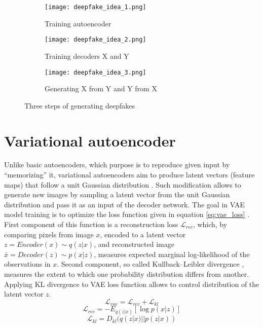 \begin{figure}[H]
\centering
\begin{subfigure}{12cm}
\texttt{[image: deepfake\_idea\_1.png]}
\caption{Training autoencoder}
\label{subfig:deepfake_steps_a}
\end{subfigure}

\begin{subfigure}{12cm}
\texttt{[image: deepfake\_idea\_2.png]}
\caption{Training decoders X and Y}
\label{subfig:deepfake_steps_b}
\end{subfigure}

\begin{subfigure}{12cm}
\texttt{[image: deepfake\_idea\_3.png]}
\caption{Generating X from Y and Y from X}
\label{subfig:deepfake_steps_c}
\end{subfigure}

\caption{Three steps of generating deepfakes}
\label{fig:deepfake_steps}
\end{figure}

\newpage
\section{Variational autoencoder}
Unlike basic autoencoders, which purpose is to reproduce given input by ``memorizing'' it, variational autoencoders aim to produce latent vectors (feature maps) that follow a unit Gaussian distribution \cite{variational_bayes_bib}. Such modification allows to generate new images by sampling a latent vector from the unit Gaussian distribution and pass it as an input of the decoder network. The goal in VAE model training is to optimize the loss function given in equation \ref{eq:vae_loss} \cite{vae_loss_bib}. First component of this function is a reconstruction loss \(\mathcal{L}_{rec}\), which, by comparing pixels from image \(x\), encoded to a latent vector \(z = Encoder(x) \sim q(z|x)\), and reconstructed image \(\bar{x} = Decoder(z) \sim p(x|z)\), measures expected marginal log-likelihood of the observations in \(x\). Second component, so called Kullback–Leibler divergence \cite{kl_divergence_bib}, measures the extent to which one probability distribution differs from another. Applying KL divergence to VAE loss function allows to control distribution of the latent vector \(z\).
%
\begin{equation}
\label{eq:vae_loss}
\mathcal{L}_{vae} = \mathcal{L}_{rec} + \mathcal{L}_{kl}
\end{equation}
%
\begin{equation}
\label{eq:rec_loss}
\mathcal{L}_{rec} = -E_{q(z|x)}[\log{p(x|z)}]
\end{equation}
%
\begin{equation}
\label{eq:kl_loss}
\mathcal{L}_{kl} = D_{kl}(q(z|x)||p(z|x))
\end{equation}


